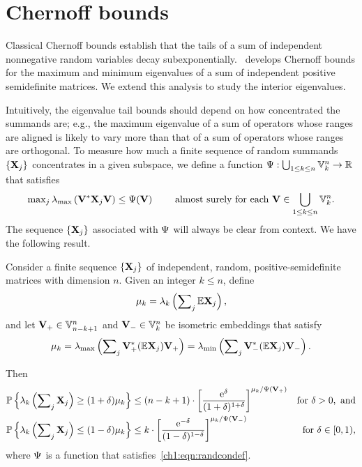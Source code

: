 \section{Chernoff bounds}
\label{ch1:sec:chernoffbounds}

Classical Chernoff bounds establish that the tails of a sum of independent
nonnegative random variables decay subexponentially. \cite{T10a}~develops
Chernoff bounds for the maximum and minimum eigenvalues of a sum of independent
positive semidefinite matrices. We extend this analysis to study the interior
eigenvalues. 

Intuitively, the eigenvalue tail bounds should depend on how concentrated the
summands are; e.g., the maximum eigenvalue of a sum of operators whose ranges
are aligned is likely to vary more than that of a sum of operators whose ranges
are orthogonal. To measure how much a finite sequence of random summands
$\{\mathbf{X}_j\}$ concentrates in a given subspace, we define a function $\Psi
: \bigcup_{1 \leq k \leq n} \mathbb{V}_{k}^{n} \rightarrow \mathbb{R}$ that satisfies
\begin{equation}
	\max\nolimits_j \lambda_{\mathrm{max}}\left(\mathbf{V}^* \mathbf{X}_j \mathbf{V}\right) \leq
\Psi(\mathbf{V}) \qquad \text{ almost surely for each } \mathbf{V} \in \bigcup_{1
\leq k \leq n} \mathbb{V}_{k}^{n}. 
\label{ch1:eqn:randcondef}
\end{equation}
The sequence $\{\mathbf{X}_j\}$ associated with $\Psi$ will always be clear
from context. We have the following result.
\begin{thm}
Consider a finite sequence $\{\mathbf{X}_j\}$ of independent, random,
positive-semidefinite matrices with dimension $n.$ Given an integer $k \leq n$,
define 
\[
\mu_k = \lambda_k\left(\sum\nolimits_j \mathbb{E} \mathbf{X}_j\right),
\]
and let $\mathbf{V}_{+} \in \mathbb{V}_{n-k+1}^{n}$ and $\mathbf{V}_{-} \in \mathbb{V}_{k}^{n}$ be
isometric embeddings that satisfy 
 $$ \mu_k = \lambda_{\mathrm{max}}\left(\sum\nolimits_j \mathbf{V}_{+}^* (\mathbb{E}
\mathbf{X}_j)\mathbf{V}_{+}\right) = \lambda_{\mathrm{min}}\left(\sum\nolimits_j \mathbf{V}_{-}^* (\mathbb{E}
\mathbf{X}_j)\mathbf{V}_{-}\right). $$

Then 
\begin{align*}
\mathbb{P}\left\{\lambda_k\left( \sum\nolimits_j \mathbf{X}_j \right) \geq (1+\delta)\mu_k\right\} &
\leq (n-k+1) \cdot \left[\frac{\mathrm{e}^\delta}{(1+\delta)^{1+\delta}}
\right]^{\mu_k/\Psi(\mathbf{V}_{+})} 
 & \text{for } \delta > 0, \text{ and} \\ 
\mathbb{P}\left\{\lambda_k\left(\sum\nolimits_j \mathbf{X}_j \right) \leq (1-\delta)\mu_k\right\} &
\leq k \cdot
\left[\frac{\mathrm{e}^{-\delta}}{(1-\delta)^{1-\delta}}\right]^{\mu_k/\Psi(\mathbf{V}_
{-})} &  \text{for } \delta \in [0,1),
\end{align*}
where $\Psi$ is a function that satisfies~\eqref{ch1:eqn:randcondef}.
\label{ch1:thm:chernoff}
\end{thm}

